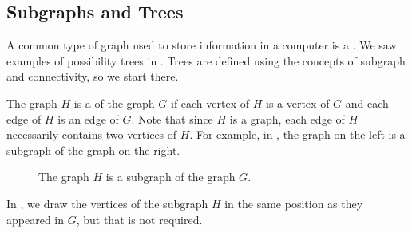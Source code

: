 
\newcommand{\subgraphtrees}{Subgraphs and Trees}
\subsection{\subgraphtrees}
\label{sub_subgraph_tree}

A common type of graph used to store information in a computer is a . We saw examples of possibility trees in .  Trees are defined using the concepts of subgraph and connectivity, so we start there.

\begin{defn}[Subgraph]
\label{defn_subgraph}
    The graph $H$ is a  of the graph $G$ if each vertex of $H$ is a vertex of $G$ and each edge of $H$ is an edge of $G$. Note that since $H$ is a graph, each edge of $H$ necessarily contains two vertices of $H$. For example, in , the graph on the left is a subgraph of the graph on the right.
        \begin{figure}[hbtp]
            \centering
            
            \caption{The graph $H$ is a subgraph of the graph $G$.}
            \label{fig_subgraph_order6}
        \end{figure} 
\end{defn}

In , we draw the vertices of the subgraph $H$ in the same position as they appeared in $G$, but that is not required.

